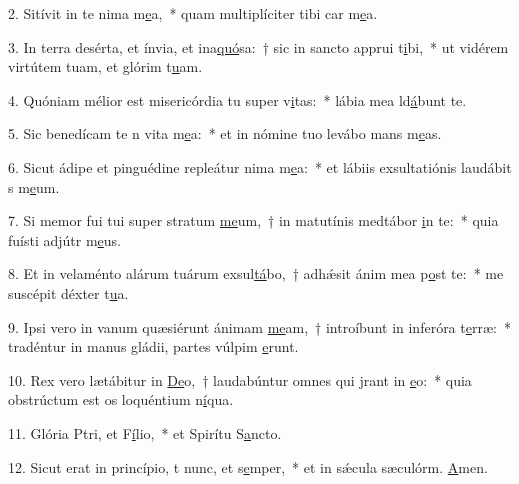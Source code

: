 2. Sitívit in te nima m\uline{e}a,~* quam multiplíciter tibi car m\uline{e}a.\par 
3. In terra desérta, et ínvia, et ina\uline{quó}sa:~† sic in sancto apprui t\uline{i}bi,~* ut vidérem virtútem tuam, et glórim t\uline{u}am.\par 
4. Quóniam mélior est misericórdia tu super v\uline{i}tas:~* lábia mea ld\uline{á}bunt te.\par 
5. Sic benedícam te n vita m\uline{e}a:~* et in nómine tuo levábo mans m\uline{e}as.\par 
6. Sicut ádipe et pinguédine repleátur nima m\uline{e}a:~* et lábiis exsultatiónis laudábit s m\uline{e}um.\par 
7. Si memor fui tui super stratum \uline{me}um,~† in matutínis medtábor \uline{i}n te:~* quia fuísti adjútr m\uline{e}us.\par 
8. Et in velaménto alárum tuárum exsul\uline{tá}bo,~† adhǽsit ánim mea p\uline{o}st te:~* me suscépit déxter t\uline{u}a.\par 
9. Ipsi vero in vanum quæsiérunt ánimam \uline{me}am,~† introíbunt in inferóra t\uline{e}rræ:~* tradéntur in manus gládii, partes vúlpim \uline{e}runt.\par 
10. Rex vero lætábitur in \uline{De}o,~† laudabúntur omnes qui jrant in \uline{e}o:~* quia obstrúctum est os loquéntium n\uline{í}qua.\par 
11. Glória Ptri, et F\uline{í}lio,~* et Spirítu S\uline{a}ncto.\par 
12. Sicut erat in princípio, t nunc, et s\uline{e}mper,~* et in sǽcula sæculórm. \uline{A}men.\par 
